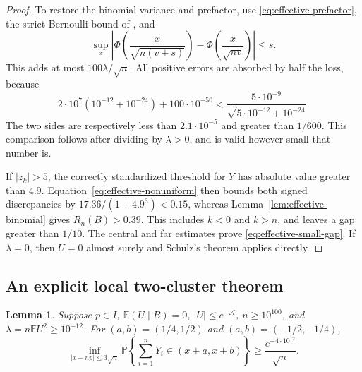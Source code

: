 \documentclass[aop]{imsart}
\theoremstyle{plain}
\newtheorem{lemma}[theorem]{Lemma}
\theoremstyle{definition}
\theoremstyle{definition}
\newcommand{\PP}{\mathbb P}
\newcommand{\EE}{\mathbb E}
\begin{document}
\begin{proof}
To restore the binomial variance and prefactor, use
\eqref{eq:effective-prefactor}, the strict Bernoulli bound
of \cite[Theorem~1, p.~1]{Schulz2016}, and
\[
 \sup_x\left|\Phi\left(\frac{x}{\sqrt{n(v+s)}}\right)
             -\Phi\left(\frac{x}{\sqrt{nv}}\right)\right|\le s.
\]
This adds at most $100\lambda/\sqrt n$.
All positive errors are absorbed by half the loss, because
\[
 2\cdot10^7(10^{-12}+10^{-24})+100\cdot10^{-50}
 <\frac{5\cdot10^{-9}}{\sqrt{5\cdot10^{-12}+10^{-24}}}.
\]
The two sides are respectively less than $2.1\cdot10^{-5}$ and
greater than $1/600$.  This comparison follows after dividing by
$\lambda>0$, and is valid however small that number is.

If $|z_k|>5$, the correctly standardized threshold for $Y$ has
absolute value greater than $4.9$.  Equation~\eqref{eq:effective-nonuniform}
then bounds both signed discrepancies by
$17.36/(1+4.9^3)<0.15$, whereas
Lemma~\ref{lem:effective-binomial} gives $R_n(B)>0.39$.
This includes $k<0$ and $k>n$, and leaves a gap greater than $1/10$.
The central and far estimates prove \eqref{eq:effective-small-gap}.
If $\lambda=0$, then $U=0$ almost surely and Schulz's theorem applies
directly.
\end{proof}

\subsection{An explicit local two-cluster theorem}

\begin{lemma}\label{lem:effective-local-mass}
Suppose $p\in I$, $\EE(U\mid B)=0$, $|U|\le e^{-\mathcal A}$,
$n\ge10^{100}$, and $\lambda=n\EE U^2\ge10^{-12}$.
For $(a,b)=(1/4,1/2)$ and $(a,b)=(-1/2,-1/4)$,
\begin{equation}\label{eq:effective-local-mass}
 \inf_{|x-np|\le3\sqrt n}
 \PP\left\{\sum_{i=1}^nY_i\in(x+a,x+b)\right\}
 \ge\frac{e^{-4\cdot10^{12}}}{\sqrt n}.
\end{equation}
\end{lemma}
\end{document}
